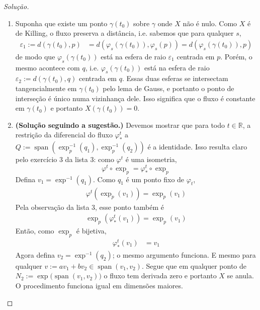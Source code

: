 \begin{proof}[Solução]\leavevmode
\begin{enumerate}[label=(\alph*)]
\item Suponha que existe um ponto \(\gamma(t_0)\) sobre \(\gamma\) onde \(X\) não é nulo.  Como \(X\) é de Killing, o fluxo preserva a distância, i.e. sabemos que para qualquer \(s\),
	\begin{align*}
	\varepsilon_1:=d(\gamma(t_0),p)&=d(\varphi_s(\gamma(t_0)),\varphi_s(p))=d(\varphi_s(\gamma(t_0)),p)
	\end{align*}
	de modo que \(\varphi_s(\gamma(t_0))\) está na esfera de raio \(\varepsilon_1\) centrada em \(p\). Porém, o mesmo acontece com \(q\), i.e. \(\varphi_s(\gamma(t_0))\) está na esfera de raio \(\varepsilon_2:=d(\gamma(t_0),q)\) centrada em \(q\). Essas duas esferas se intersectam tangencialmente em \(\gamma(t_0)\) pelo lema de Gauss, e portanto o ponto de interseção é único numa vizinhança dele. Isso significa que o fluxo é constante em \(\gamma(t_0)\) e portanto \(X(\gamma(t_0))=0\).

	\item \textbf{(Solução seguindo a sugestão.)} Devemos mostrar que para todo \(t \in \mathbb{R}\), a restrição da diferencial do fluxo \(\varphi^t_*\) a  \(Q:=\operatorname{span}(\operatorname{exp}_p^{-1}(q_1),\operatorname{exp}_p^{-1}(q_2))\) é a identidade. Isso resulta claro pelo exercício 3 da lista 3: como \(\varphi^t\) é uma isometria,
		\[\varphi^t \circ \operatorname{exp}_p=\varphi^t_* \circ \operatorname{exp}_p\]
Defina \(v_1=\operatorname{exp}^{-1}(q_1)\). Como \(q_1\) é um ponto fixo de \(\varphi_t\),
\begin{align*}\varphi^t(\operatorname{exp}_p(v_1))=\operatorname{exp}_p(v_1)
\end{align*}
Pela observação da lista 3, esse ponto também é
\begin{align*}
\operatorname{exp}_p(\varphi_*^t(v_1))=\operatorname{exp}_p(v_1)
\end{align*}
Então, como \(\operatorname{exp}_p\) é bijetiva,
\begin{align*}
\varphi_*^t(v_1)&=v_1
\end{align*}
Agora defina \(v_2=\operatorname{exp}^{-1}(q_2)\); o mesmo argumento funciona. E mesmo para qualquer \(v:=av_1+b v_2 \in \operatorname{span}(v_1,v_2)\). Segue que em qualquer ponto de \(N_2:=\operatorname{exp}\Big(\operatorname{span}(v_1,v_2)\Big)\) o fluxo tem derivada zero e portanto \(X\) se anula. O procedimento funciona igual em dimensões maiores.


\end{enumerate}
\end{proof}
